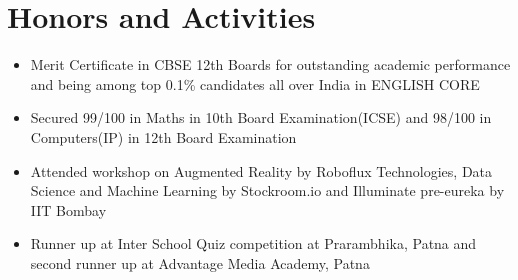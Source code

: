 \documentclass[11pt,a4paper,SANS]{moderncv}        %
\begin{document}
\section{ Honors and Activities
}
\vspace{6pt}
\begin{itemize}
\item Merit Certificate in CBSE 12th Boards for outstanding academic performance and being among top 0.1\% candidates all over India in ENGLISH CORE
\item Secured 99/100 in Maths in 10th Board Examination(ICSE) and 98/100 in Computers(IP) in 12th Board Examination
\item  Attended workshop on Augmented Reality by Roboflux Technologies, Data Science and Machine Learning by Stockroom.io and Illuminate pre-eureka by IIT Bombay
\item Runner up at Inter School Quiz competition at Prarambhika, Patna and second runner up at Advantage Media Academy, Patna
\end{itemize}



\nocite{*}



\end{document}

